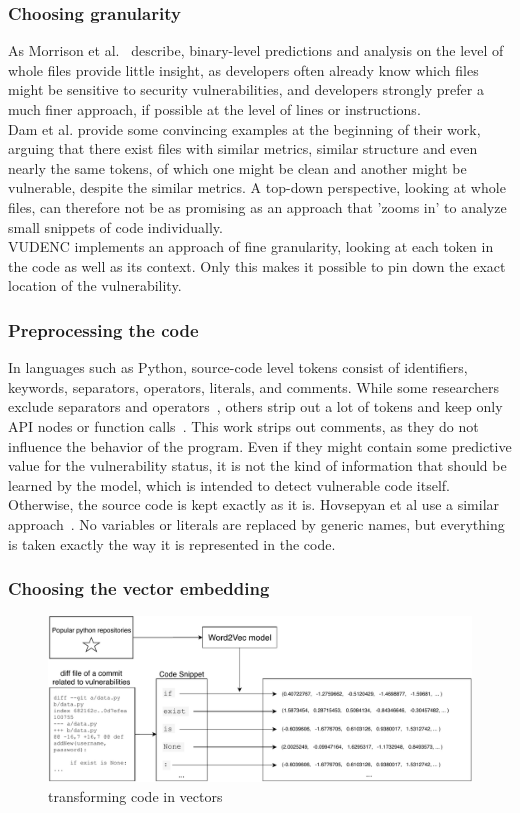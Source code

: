 \documentclass[
a4paper,
pagesize,
pdftex,
12pt,
twoside, %
BCOR=5mm, %
ngerman,
fleqn,
final,
]{scrartcl}
\begin{document}
	\subsubsection{Choosing granularity}
	As Morrison  et al.~\cite{Morrison.2015} describe, binary-level predictions and analysis on the level of whole files provide little insight, as developers often already know which files might be sensitive to security vulnerabilities, and developers strongly prefer a much finer approach, if possible at the level of lines or instructions.\\
	Dam et al.\cite{Dam.2017} provide some convincing examples at the beginning of their work, arguing that there exist files with similar metrics, similar structure and even nearly the same tokens, of which one might be clean and another might be vulnerable, despite the similar metrics. A top-down perspective, looking at whole files, can therefore not be as promising as an approach that 'zooms in' to analyze small snippets of code individually.\\
	VUDENC implements an approach of fine granularity, looking at each token in the code as well as its context. Only this makes it possible to pin down the exact location of the vulnerability. 
	
	\subsubsection{Preprocessing the code}
	In languages such as Python, source-code level tokens consist of identifiers, keywords, separators, operators, literals, and comments. While some researchers exclude separators and operators~\cite{Pang.2015}, others strip out a lot of tokens and keep only API nodes or function calls~\cite{Yamaguchi.2012}. This work strips out comments, as they do not influence the behavior of the program. Even if they might contain some predictive value for the vulnerability status, it is not the kind of information that should be learned by the model, which is intended to detect vulnerable code itself. Otherwise, the source code is kept exactly as it is. Hovsepyan et al use a similar approach~\cite{Hovsepyan.2012}. No variables or literals are replaced by generic names, but everything is taken exactly the way it is represented in the code. 
	
	\subsubsection{Choosing the vector embedding}
	\begin{figure}[ht]
		\centering
		\includegraphics[width=\linewidth]{img/Word2Vec}
		\caption{transforming code in vectors}
		\label{fig:word2vec}
	\end{figure}
	
\end{document}
